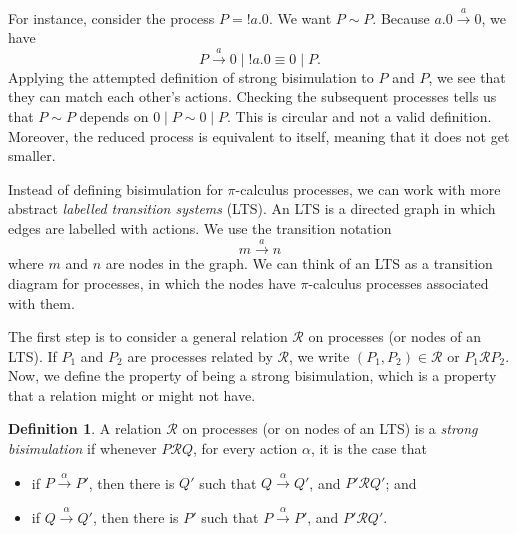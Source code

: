 \documentclass[a4paper, openany]{memoir}
\theoremstyle{definition}
\newtheorem{definition}[proposition]{Definition}
\begin{document}
    For instance, consider the process $P = !a.0$. We want $P \sim P$. Because $a.0 \xrightarrow{a} 0$, we have
    \[P \xrightarrow{a} 0 \mid !a.0 \equiv 0 \mid P.\]
    Applying the attempted definition of strong bisimulation to $P$ and $P$, we see that they can match each other's actions. Checking the subsequent processes tells us that $P \sim P$ depends on $0 \mid P \sim 0 \mid P$. This is circular and not a valid definition. Moreover, the reduced process is equivalent to itself, meaning that it does not get smaller.

    Instead of defining bisimulation for $\pi$-calculus processes, we can work with more abstract \emph{labelled transition systems} (LTS). An LTS is a directed graph in which edges are labelled with actions. We use the transition notation
    \[m \xrightarrow{a} n\]
    where $m$ and $n$ are nodes in the graph. We can think of an LTS as a transition diagram for processes, in which the nodes have $\pi$-calculus processes associated with them.

    The first step is to consider a general relation $\mathcal{R}$ on processes (or nodes of an LTS). If $P_1$ and $P_2$ are processes related by $\mathcal{R}$, we write $(P_1, P_2) \in \mathcal{R}$ or $P_1 \mathcal{R} P_2$. Now, we define the property of being a strong bisimulation, which is a property that a relation might or might not have.
    \begin{definition}
        A relation $\mathcal{R}$ on processes (or on nodes of an LTS) is a \emph{strong bisimulation} if whenever $P \mathcal{R} Q$, for every action $\alpha$, it is the case that
        \begin{itemize}
            \item if $P \xrightarrow{\alpha} P'$, then there is $Q'$ such that $Q \xrightarrow{\alpha} Q'$, and $P' \mathcal{R} Q'$; and
            \item if $Q \xrightarrow{\alpha} Q'$, then there is $P'$ such that $P \xrightarrow{\alpha} P'$, and $P' \mathcal{R} Q'$.
        \end{itemize}
    \end{definition}
\end{document}
